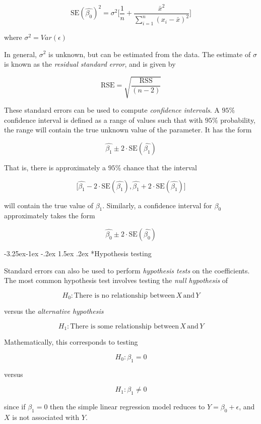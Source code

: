 \documentclass[]{book}
\makeatletter
\renewcommand\subsection{\@startsection{subsection}{2}{\z@}%
                                     {-3.25ex\@plus -1ex \@minus -.2ex}%
                                     {1.5ex \@plus .2ex}%
                                     {\normalfont\large\bfseries\color{Violet}}}
\theoremstyle{definition}
\theoremstyle{definition}
\theoremstyle{definition}
\theoremstyle{remark}
\makeatother
\begin{document}
\[ \text{SE}(\hat{\beta_0})^2 = \sigma^2 \bigg[ \frac{1}{n} +  \frac{\bar{x}^2}{\sum_{i=1}^{n} (x_i - \bar{x})^2} \bigg] \]

where \(\sigma^2 = Var(\epsilon)\)

In general, \(\sigma^2\) is unknown, but can be estimated from the data.
The estimate of \(\sigma\) is known as the \emph{residual standard
error}, and is given by

\[ \text{RSE} = \sqrt{\frac{\text{RSS}}{(n-2)}} \]

These standard errors can be used to compute \emph{confidence
intervals}. A \(95\%\) confidence interval is defined as a range of
values such that with \(95\%\) probability, the range will contain the
true unknown value of the parameter. It has the form

\[ \hat{\beta_1} \pm 2 \cdot \text{SE}(\hat{\beta_1}) \]

That is, there is approximately a \(95\%\) chance that the interval

\[ \bigg[  \hat{\beta_1} - 2 \cdot \text{SE}(\hat{\beta_1}), \hat{\beta_1} + 2 \cdot \text{SE}(\hat{\beta_1})   \bigg] \]

will contain the true value of \(\beta_1\). Similarly, a confidence
interval for \(\beta_0\) approximately takes the form

\[ \hat{\beta_0} \pm 2 \cdot \text{SE}(\hat{\beta_0}) \]

\subsection*{Hypothesis testing}\label{hypothesis-testing}

Standard errors can also be used to perform \emph{hypothesis tests} on
the coefficients. The most common hypothesis test involves testing the
\emph{null hypothesis} of

\[ H_0 : \text{There is no relationship between} \, X \, \text{and} \, Y \]

versus the \emph{alternative hypothesis}

\[ H_1 : \text{There is some relationship between} \, X \, \text{and} \, Y \]

Mathematically, this corresponds to testing

\[ H_0 : \beta_1 = 0 \]

versus

\[ H_1 : \beta_1 \neq 0 \]

since if \(\beta_1 = 0\) then the simple linear regression model reduces
to \(Y = \beta_0 + \epsilon\), and \(X\) is not associated with \(Y\).
\end{document}
